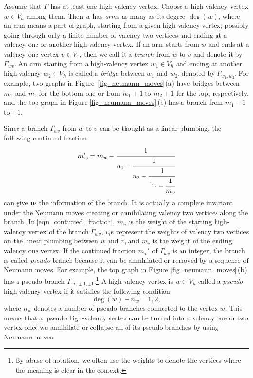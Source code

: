 \documentclass[pdftex]{sigma}
\numberwithin{equation}{section}
\begin{document}
Assume that $ \Gamma $ has at least one high-valency vertex. Choose a high-valency vertex $ w\in V_h $ among them. Then $ w $ has \textit{arm}s as many as its degree $ \deg(w) $, where an arm means a part of graph, starting from a given high-valency vertex, possibly going through only a finite number of valency two vertices and ending at a valency one or another high-valency vertex. If an arm starts from $ w $ and ends at a valency one vertex $ v\in V_1 $, then we call it a \textit{branch} from $ w $ to $ v $ and denote it by $ \Gamma_{wv} $. An arm starting from a high-valency vertex $ w_1\in V_h $ and ending at another high-valency $ w_2\in V_h $ is called a \textit{bridge} between $ w_1 $ and $ w_2 $, denoted by $ \Gamma_{w_1,w_2} $. For example, two graphs in Figure~\ref{fig_neumann_moves}\,(a) have bridges between $ m_1 $ and $ m_2 $ for the bottom one or from $ m_1\pm 1 $ to $ m_2\pm 1 $ for the top, respectively, and the top graph in Figure \ref{fig_neumann_moves}\,(b) has a branch from $ m_1\pm 1 $ to $ \pm 1 $.

Since a branch $ \Gamma_{wv} $ from $ w $ to $ v $ can be thought as a linear plumbing, the following continued fraction
\begin{equation}\label{eqn_continued_fraction}
	m_w'=m_w-\cfrac{1}{u_1-\cfrac{1}{u_2-\cfrac{1}{\ddots - \cfrac{1}{m_v}}}}
\end{equation}
can give us the information of the branch. It is actually a complete invariant under the Neumann moves creating or annihilating valency two vertices along the branch. In \eqref{eqn_continued_fraction}, $ m_w $ is the weight of the starting high-valency vertex of the branch $ \Gamma_{wv} $, $ u_i $s represent the weights of valency two vertices on the linear plumbing between $ w $ and $ v $, and $ m_v $ is the weight of the ending valency one vertex. If the continued fraction $ m_w' $ of $ \Gamma_{wv} $ is an integer, the branch is called \textit{pseudo} branch because it can be annihilated or removed by a sequence of Neumann moves. For example, the top graph in Figure \ref{fig_neumann_moves}\,(b) has a pseudo-branch $\Gamma_{m_1\pm1, \pm1}$.\footnote{By abuse of notation, we often use the weights to denote the vertices where the meaning is clear in the context.} A high-valency vertex is $w\in V_h$ called a \textit{pseudo} high-valency vertex if it satisfies the following condition
\[
\deg(w) - n_w = 1, 2,
\]
where $n_w$ denotes a number of pseudo branches connected to the vertex $w$. This means that a~pseudo high-valency vertex can be turned into a valency one or two vertex once we annihilate or collapse all of its pseudo branches by using Neumann moves.
\end{document}
